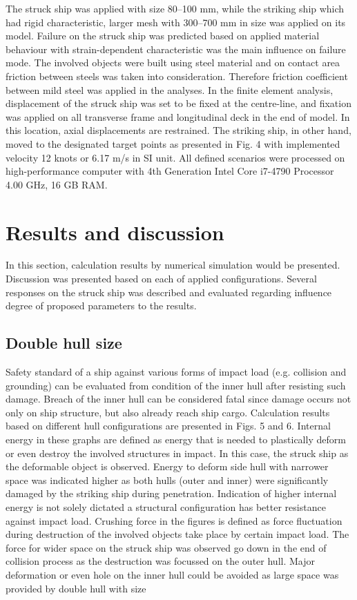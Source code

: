 \documentclass[10pt,journal]{IEEEtran}
\begin{document}
The struck ship was applied with size 80–100 mm, while the striking ship which had rigid characteristic, larger mesh with 300–700 mm in size was applied on its model. 
Failure on the struck ship was predicted based on applied material behaviour with strain-dependent characteristic was the main influence on failure mode. 
The involved objects were built using steel material and on contact area friction between steels was taken into consideration. Therefore friction coefficient between mild steel was applied in the analyses. 
In the finite element analysis, displacement of the struck ship was set to be fixed at the centre-line, and fixation was applied on all transverse frame and longitudinal deck in the end of model. 
In this location, axial displacements are restrained. The striking ship, in other hand, moved to the designated target points as presented in Fig. 4 with implemented velocity 12 knots or 6.17 m/s in SI unit. 
All defined scenarios were processed on high-performance computer with 4th Generation Intel Core i7-4790 Processor 4.00 GHz, 16 GB RAM. 

\section{Results and discussion }

In this section, calculation results by numerical simulation would be presented. Discussion was presented based on each of applied configurations. 
Several responses on the struck ship was described and evaluated regarding influence degree of proposed parameters to the results. 

\subsection{Double hull size}

Safety standard of a ship against various forms of impact load (e.g. collision and grounding) can be evaluated from condition of the inner hull after resisting such damage. 
Breach of the inner hull can be considered fatal since damage occurs not only on ship structure, but also already reach ship cargo. Calculation results based on different hull configurations are presented in Figs. 5 and 6. 
Internal energy in these graphs are defined as energy that is needed to plastically deform or even destroy the involved structures in impact. 
In this case, the struck ship as the deformable object is observed. Energy to deform side hull with narrower space was indicated higher as both hulls (outer and inner) were significantly damaged by the striking ship during penetration. 
Indication of higher internal energy is not solely dictated a structural configuration has better resistance against impact load. 
Crushing force in the figures is defined as force fluctuation during destruction of the involved objects take place by certain impact load. 
The force for wider space on the struck ship was observed go down in the end of collision process as the destruction was focussed on the outer hull. Major deformation or even hole on the inner hull could be 
avoided as large space was provided by double hull with size
\end{document}
